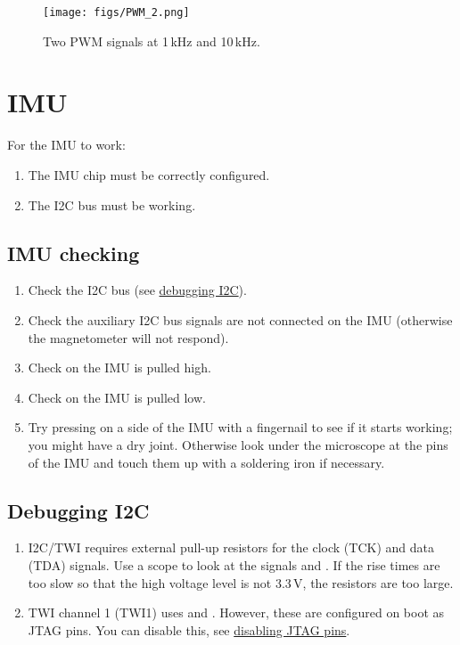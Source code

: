 \begin{figure}
\centering
\texttt{[image: figs/PWM\_2.png]}
\caption{Two PWM signals at 1\,kHz and 10\,kHz.}
\end{figure}


\section{IMU}
\label{imu}

For the IMU to work:
%
\begin{enumerate}
\item The IMU chip must be correctly configured.  
\item The I2C bus must be working.
\end{enumerate}


\subsection{IMU checking}
\label{checking-IMU}

\begin{enumerate}
\item Check the I2C bus (see \hyperref[debugging-i2c]{debugging I2C}).
\item Check the auxiliary I2C bus signals are not connected on the IMU
  (otherwise the magnetometer will not respond).
\item Check  on the IMU is pulled high.
\item Check  on the IMU is pulled low.  
\item Try pressing on a side of the IMU with a fingernail to see if it
  starts working; you might have a dry joint.  Otherwise look under
  the microscope at the pins of the IMU and touch them up with a
  soldering iron if necessary.
\end{enumerate}


\subsection{Debugging I2C}
\label{debugging-i2c}

\begin{enumerate}
\item
  I2C/TWI requires external pull-up resistors for the clock (TCK) and
  data (TDA) signals.  Use a scope to look at the signals
   and .  If the rise times are too slow so
  that the high voltage level is not 3.3\,V, the resistors are too
  large.
\item
  TWI channel 1 (TWI1) uses  and . However, these
  are configured on boot as JTAG pins. You can disable this, see
  \hyperref[disabling-jtag-pins]{disabling JTAG pins}.
\end{enumerate}

